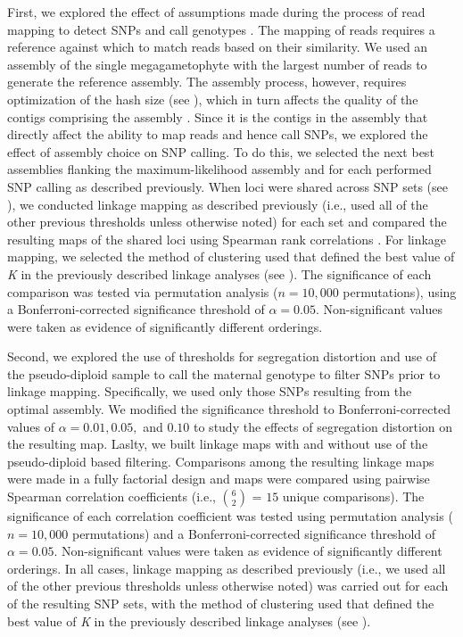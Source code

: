 \documentclass[11pt]{article}
\begin{document}
First, we explored the effect of assumptions made during the process of read mapping to detect SNPs and call genotypes \citep[cf.][]{Pool:2010}.
The mapping of reads requires a reference against which to match reads based on their similarity. We used an assembly
of the single megagametophyte with the largest number of reads to generate the
reference assembly. The assembly process, however, requires optimization of the hash size (see ),
which in turn affects the quality of the contigs comprising the assembly \citep{Bradnam:2013uu,Earl:2011gt,Salzberg:2011fr}.  
Since it is the contigs in the assembly that directly affect the ability to map reads and hence call SNPs, we explored the effect
of assembly choice on SNP calling. To do this, we selected the next best assemblies flanking the maximum-likelihood assembly 
and for each performed SNP calling as described previously. When loci were shared across SNP sets (see ), we 
conducted linkage mapping as
described previously (i.e., used all of the other previous thresholds unless otherwise noted) for each
set and compared the resulting maps of the shared loci using Spearman rank correlations \citep{Spearman:1904}. 
For linkage mapping, we selected the method of clustering used that defined the best 
value of \textit{K} in the previously described linkage analyses (see ). 
The significance of each comparison was tested via permutation 
analysis ($n = 10,000$ permutations), using a Bonferroni-corrected significance threshold of $\alpha = 0.05$. Non-significant values 
were taken as evidence of significantly different orderings.

Second, we explored the use of thresholds for segregation distortion and 
use of the pseudo-diploid sample to call the maternal genotype to filter SNPs prior to linkage mapping. 
Specifically, we used only those SNPs resulting from the optimal assembly.
We modified the significance threshold to Bonferroni-corrected values of $\alpha = 0.01, 0.05,$ and $0.10$ to 
study the effects of segregation distortion on the resulting map. Laslty, we built linkage maps with and without
use of the pseudo-diploid based filtering. Comparisons among the resulting linkage maps were made
in a fully factorial design and maps were compared using pairwise Spearman correlation coefficients 
(i.e., {$6 \choose 2$} = $15$ unique comparisons). The significance of each correlation coefficient 
was tested using permutation analysis ($n = 10,000$ permutations) and a Bonferroni-corrected significance threshold of $\alpha = 0.05$. 
Non-significant values were taken as evidence of significantly different orderings.
In all cases, linkage mapping as described previously  (i.e., we used all of the other previous thresholds unless otherwise noted) 
was carried out for each of the resulting SNP sets, with the method of clustering used that defined 
the best value of \textit{K} in the previously described linkage analyses (see ). 
\end{document}
